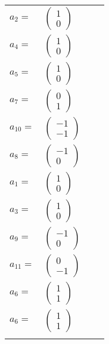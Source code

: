 \documentclass[1p]{elsarticle_modified}
\theoremstyle{definition}
\begin{document}
\begin{tabular}{m{7pt} m{180pt} m{7pt} m{180pt} }
\flushright $a_{2}=$&$\begin{pmatrix}1\\0\end{pmatrix}$ \\
\flushright $a_{4}=$&$\begin{pmatrix}1\\0\end{pmatrix}$ \\
\flushright $a_{5}=$&$\begin{pmatrix}1\\0\end{pmatrix}$ \\
\flushright $a_{7}=$&$\begin{pmatrix}0\\1\end{pmatrix}$ \\
\flushright $a_{10}=$&$\begin{pmatrix}-1\\-1\end{pmatrix}$ \\
\flushright $a_{8}=$&$\begin{pmatrix}-1\\0\end{pmatrix}$ \\
\flushright $a_{1}=$&$\begin{pmatrix}1\\0\end{pmatrix}$ \\
\flushright $a_{3}=$&$\begin{pmatrix}1\\0\end{pmatrix}$ \\
\flushright $a_{9}=$&$\begin{pmatrix}-1\\0\end{pmatrix}$ \\
\flushright $a_{11}=$&$\begin{pmatrix}0\\-1\end{pmatrix}$ \\
\flushright $a_{6}=$&$\begin{pmatrix}1\\1\end{pmatrix}$\\ \flushright $a_{6}=$&$\begin{pmatrix}1\\1\end{pmatrix}$\\&\end{tabular}
\end{document}
